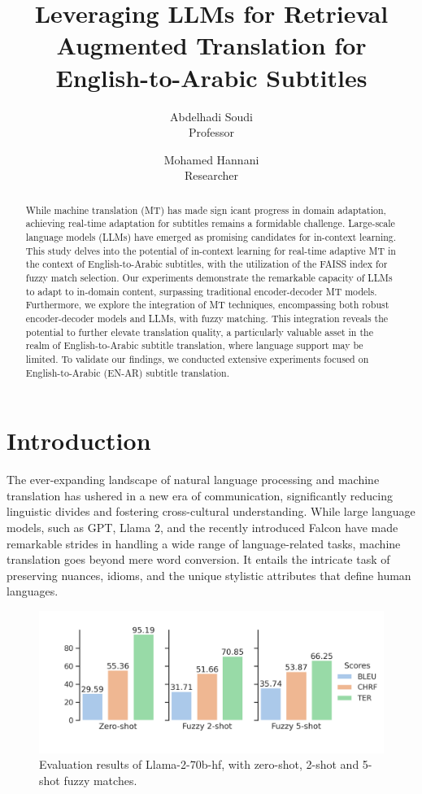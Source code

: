 \documentclass[twocolumn]{article}
\title{Leveraging LLMs for Retrieval Augmented Translation for English-to-Arabic Subtitles}
\author{
Abdelhadi Soudi \\
Professor
\and
Mohamed Hannani \\
Researcher
}
\date{}  %
\begin{document}
\maketitle

\begin{abstract}
While machine translation (MT) has made sign
icant progress in domain adaptation, achieving real-time adaptation for subtitles remains a formidable challenge. Large-scale language models (LLMs) have emerged as promising candidates for in-context learning. This study delves into the potential of in-context learning for real-time adaptive MT in the context of English-to-Arabic subtitles, with the utilization of the FAISS index for fuzzy match selection. Our experiments demonstrate the remarkable capacity of LLMs to adapt to in-domain content, surpassing traditional encoder-decoder MT models. Furthermore, we explore the integration of MT techniques, encompassing both robust encoder-decoder models and LLMs, with fuzzy matching. This integration reveals the potential to further elevate translation quality, a particularly valuable asset in the realm of English-to-Arabic subtitle translation, where language support may be limited. To validate our findings, we conducted extensive experiments focused on English-to-Arabic (EN-AR) subtitle translation.

\end{abstract}
%
\section{Introduction}\label{sec:introduction}

The ever-expanding landscape of natural language processing and machine translation has ushered in a new era of communication, significantly reducing linguistic divides and fostering cross-cultural understanding. While large language models, such as GPT, Llama 2, and the recently introduced Falcon have made remarkable strides in handling a wide range of language-related tasks, machine translation goes beyond mere word conversion. It entails the intricate task of preserving nuances, idioms, and the unique stylistic attributes that define human languages.

\begin{figure}
\centering
\includegraphics[width=\linewidth, ]{figs/Llama2_evaluation} %
\caption{ Evaluation results of Llama-2-70b-hf, with zero-shot, 2-shot and 5-shot fuzzy matches.}

\label{llama_2_evaluation:duck}
\end{figure}
\end{document}
